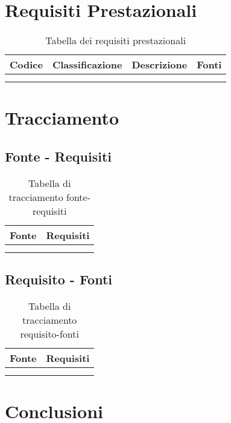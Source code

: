 \section{Requisiti Prestazionali}
\begin{table}[H]
  \centering
  \begin{tabular}{|c|c|c|c|}
    \hline
    \rowcolor[HTML]{036400}
    {\color[HTML]{FFFFFF} \textbf{Codice}} & {\color[HTML]{FFFFFF} \textbf{Classificazione}} & {\color[HTML]{FFFFFF} \textbf{Descrizione}} & {\color[HTML]{FFFFFF} \textbf{Fonti}} \\ \hline
    \rowcolor[HTML]{EFEFEF}
    &  &  &  \\ \hline
    \rowcolor[HTML]{C0C0C0}
    &  &  &  \\ \hline
  \end{tabular}
  \caption{Tabella dei requisiti prestazionali}
\end{table}

\section{Tracciamento}

\subsection{Fonte - Requisiti}
\begin{table}[H]
  \centering
  \begin{tabular}{|c|c|}
    \hline
    \rowcolor[HTML]{036400}
    {\color[HTML]{FFFFFF} Fonte} & {\color[HTML]{FFFFFF} Requisiti} \\ \hline
    \rowcolor[HTML]{EFEFEF}
    &  \\ \hline
    \rowcolor[HTML]{C0C0C0}
    &  \\ \hline
  \end{tabular}
  \caption{Tabella di tracciamento fonte-requisiti}
\end{table}

\subsection{Requisito - Fonti}
\begin{table}[H]
  \centering
  \begin{tabular}{|c|c|}
    \hline
    \rowcolor[HTML]{036400}
    {\color[HTML]{FFFFFF} Fonte} & {\color[HTML]{FFFFFF} Requisiti} \\ \hline
    \rowcolor[HTML]{EFEFEF}
    &  \\ \hline
    \rowcolor[HTML]{C0C0C0}
    &  \\ \hline
  \end{tabular}
  \caption{Tabella di tracciamento requisito-fonti}
\end{table}

\section{Conclusioni}
